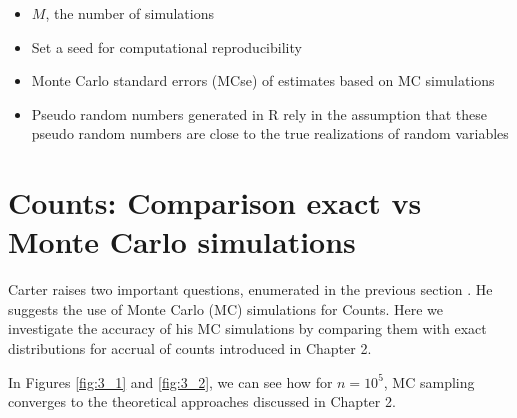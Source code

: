 \begin{itemize}
\item $M$, the number of simulations
\item Set a seed for computational reproducibility
\item Monte Carlo standard errors (MCse) of estimates based on MC simulations
\item Pseudo random numbers generated in R rely in the assumption that these pseudo random numbers are close to the true realizations of random variables \citep{held2014applied}
\end{itemize}
\section{Counts: Comparison exact vs Monte Carlo simulations}

Carter raises two important questions, enumerated in the previous section \citep{carter2004application, carter2005practical}. He suggests the use of Monte Carlo (MC) simulations for Counts. Here we investigate the accuracy of his MC simulations by comparing them with exact distributions for accrual of counts introduced in Chapter 2. 

In Figures \ref{fig:3_1} and \ref{fig:3_2}, we can see how for $n=10^5$, MC sampling converges to the theoretical approaches discussed in Chapter 2.
% 
% 
% 
% 
% 

